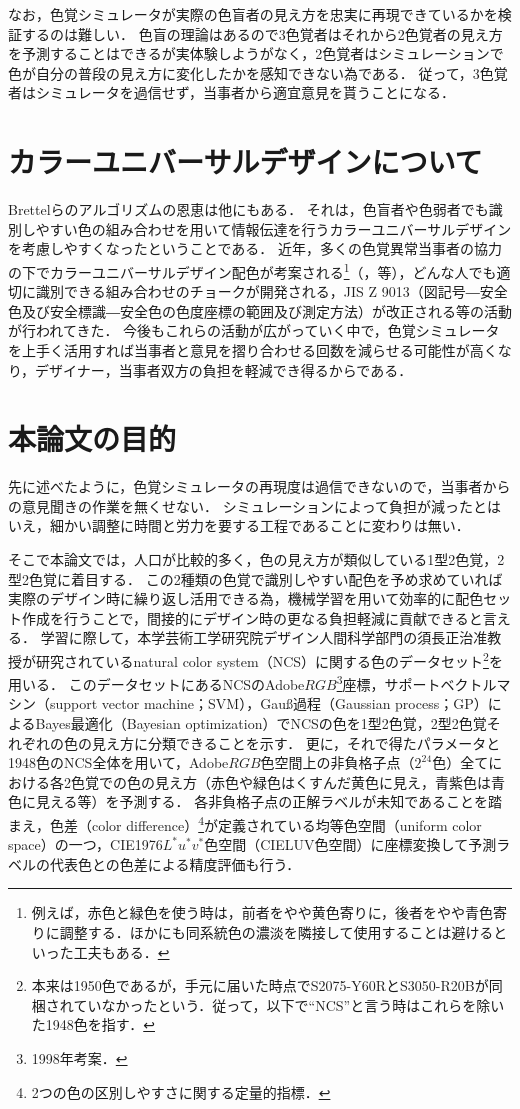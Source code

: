 \documentclass[uplatex,paper=a4,fontsize=4.0truemm,jafontsize=4.0truemm,head_space=30.0truemm,foot_space=30.0truemm,baselineskip=8.0truemm,line_length=40zw,gutter=25.0truemm,oneside,openany,fleqn,hanging_panctuation,open_bracket_pos=nibu_tentsuki,dvipdfmx,jis2004,book,titlepage]{jlreq}
\theoremstyle{mystyle}
\newcommand{\mathdisplaystyle}[1]{\(\displaystyle{#1}\)}
\begin{document}
			なお，色覚シミュレータが実際の色盲者の見え方を忠実に再現できているかを検証するのは難しい．
			色盲の理論はあるので3色覚者はそれから2色覚者の見え方を予測することはできるが実体験しようがなく，2色覚者はシミュレーションで色が自分の普段の見え方に変化したかを感知できない為である．
			従って，3色覚者はシミュレータを過信せず，当事者から適宜意見を貰うことになる．
		\section{カラーユニバーサルデザインについて}
			Brettelらのアルゴリズムの恩恵は他にもある．
			それは，色盲者や色弱者でも識別しやすい色の組み合わせを用いて情報伝達を行うカラーユニバーサルデザインを考慮しやすくなったということである．
			近年，多くの色覚異常当事者の協力の下でカラーユニバーサルデザイン配色が考案される\footnote{例えば，赤色と緑色を使う時は，前者をやや黄色寄りに，後者をやや青色寄りに調整する．ほかにも同系統色の濃淡を隣接して使用することは避けるといった工夫もある．}（\cite[pp.~1091--1099]{Okabe2002c}，\cite{cudo2018}等），どんな人でも適切に識別できる組み合わせのチョークが開発される\cite{Rikagaku2020}，JIS Z 9013（図記号―安全色及び安全標識―安全色の色度座標の範囲及び測定方法）が改正される\cite{Nakano2018}等の活動が行われてきた．
			今後もこれらの活動が広がっていく中で，色覚シミュレータを上手く活用すれば当事者と意見を摺り合わせる回数を減らせる可能性が高くなり，デザイナー，当事者双方の負担を軽減でき得るからである．
		\section{本論文の目的}
			先に述べたように，色覚シミュレータの再現度は過信できないので，当事者からの意見聞きの作業を無くせない．
			シミュレーションによって負担が減ったとはいえ，細かい調整に時間と労力を要する工程であることに変わりは無い．

			そこで本論文では，人口が比較的多く，色の見え方が類似している1型2色覚，2型2色覚に着目する．
			この2種類の色覚で識別しやすい配色を予め求めていれば実際のデザイン時に繰り返し活用できる為，機械学習を用いて効率的に配色セット作成を行うことで，間接的にデザイン時の更なる負担軽減に貢献できると言える．
			学習に際して，本学芸術工学研究院デザイン人間科学部門の須長正治准教授が研究されているnatural color system（NCS）に関する色のデータセット\footnote{本来は1950色であるが，手元に届いた時点でS2075-Y60RとS3050-R20Bが同梱されていなかったという．従って，以下で``NCS''と言う時はこれらを除いた1948色を指す．}を用いる．
			このデータセットにあるNCSのAdobe\mathdisplaystyle{RGB}\footnote{1998年考案．}座標，サポートベクトルマシン（support vector machine；SVM），Gauß過程（Gaussian process；GP）によるBayes最適化（Bayesian optimization）でNCSの色を1型2色覚，2型2色覚それぞれの色の見え方に分類できることを示す．
			更に，それで得たパラメータと1948色のNCS全体を用いて，Adobe\mathdisplaystyle{RGB}色空間上の非負格子点（\mathdisplaystyle{2^{24}}色）全てにおける各2色覚での色の見え方（赤色や緑色はくすんだ黄色に見え，青紫色は青色に見える等）を予測する．
			各非負格子点の正解ラベルが未知であることを踏まえ，色差（color difference）\footnote{2つの色の区別しやすさに関する定量的指標．}が定義されている均等色空間（uniform color space）の一つ，CIE1976\mathdisplaystyle{L^\ast u^\ast v^\ast}色空間（CIELUV色空間）\cite[p.~64]{Yaguchi2017b}に座標変換して予測ラベルの代表色との色差による精度評価も行う．
\end{document}
